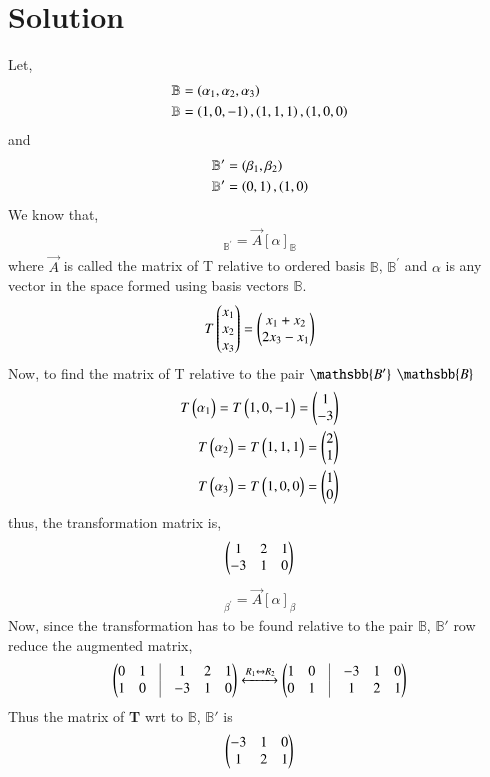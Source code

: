 \documentclass[journal,12pt,twocolumn]{IEEEtran}
\begin{document}
\section{\textbf{Solution}}
Let,
\begin{align}
\mathbb{B} &= \left(\alpha_1,\alpha_2,\alpha_3\right)\\
\mathbb{B} &= {\left(1,0,-1\right),\left(1,1,1\right),\left(1,0,0\right)}
\end{align}
and
\begin{align}
    \mathbb{B'} &= \left(\beta_1,\beta_2\right)\nonumber\\
 \mathbb{B'}   &={\left(0,1\right),\left(1,0\right)}
\end{align}
We know that,
\begin{align}
[T\alpha]_{\mathbb{B}^{'}}=\vec{A}[\alpha]_{\mathbb{B}}\label{T}
\end{align}
where $\vec{A}$ is called the matrix of T relative to ordered basis $\mathbb{B}$, $\mathbb{B}^{'}$ and $\alpha$ is any vector in the space formed using basis vectors $\mathbb{B}$.
\begin{align}
T\begin{pmatrix}x_1\\x_2\\x_3\end{pmatrix}=\begin{pmatrix}x_1+x_2\\2x_3-x_1\end{pmatrix}
\end{align}
Now, to find the matrix of T relative to the pair $\mathsbb{B'}$ $\mathsbb{B}$ 
\begin{align}
T\begin{pmatrix}\alpha_1\end{pmatrix}=T\begin{pmatrix}1,0,-1\end{pmatrix}=\begin{pmatrix}1\\-3\end{pmatrix}\nonumber\\
T\begin{pmatrix}\alpha_2\end{pmatrix}=T\begin{pmatrix}1,1,1\end{pmatrix}=\begin{pmatrix}2\\1\end{pmatrix}\nonumber\\
T\begin{pmatrix}\alpha_3\end{pmatrix}=T\begin{pmatrix}1,0,0\end{pmatrix}=\begin{pmatrix}1\\0\end{pmatrix}
\end{align}
thus, the transformation matrix is,
\begin{align}
\begin{pmatrix}1&2&1\\-3&1&0\end{pmatrix}
\end{align}
\begin{align}
[T\alpha]_{\beta^{'}}=\vec{A}[\alpha]_{\beta}\label{T}
\end{align}
Now, since the transformation has to be found relative to the pair $\mathbb{B}$, $\mathbb{B'}$ row reduce the augmented matrix,
\begin{align}
\myvec{0&1&\vline&1&2&1\\1&0&\vline&-3&1&0}\xleftrightarrow{R_1\leftrightarrow R_2}\myvec{1&0&\vline&-3&1&0\\0&1&\vline&1&2&1}
\end{align}
Thus the matrix of \textbf{T} wrt to $\mathbb{B}$, $\mathbb{B'}$ is 
\begin{align}
\begin{pmatrix}-3&1&0\\1&2&1\end{pmatrix}
\end{align}
\end{document}
